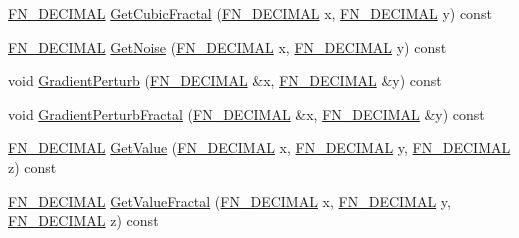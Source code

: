 \begin{DoxyCompactItemize}
\item 
\mbox{\hyperlink{_fast_noise_8h_a75a9ef6d2541c4921815b885bfd449c3}{F\+N\+\_\+\+D\+E\+C\+I\+M\+AL}} \mbox{\hyperlink{class_fast_noise_ae0ecd8c5e0bce59f68e11ad885f4284a}{Get\+Cubic\+Fractal}} (\mbox{\hyperlink{_fast_noise_8h_a75a9ef6d2541c4921815b885bfd449c3}{F\+N\+\_\+\+D\+E\+C\+I\+M\+AL}} x, \mbox{\hyperlink{_fast_noise_8h_a75a9ef6d2541c4921815b885bfd449c3}{F\+N\+\_\+\+D\+E\+C\+I\+M\+AL}} y) const
\item 
\mbox{\hyperlink{_fast_noise_8h_a75a9ef6d2541c4921815b885bfd449c3}{F\+N\+\_\+\+D\+E\+C\+I\+M\+AL}} \mbox{\hyperlink{class_fast_noise_a61722acaa5692a40ee939d578b6a40d1}{Get\+Noise}} (\mbox{\hyperlink{_fast_noise_8h_a75a9ef6d2541c4921815b885bfd449c3}{F\+N\+\_\+\+D\+E\+C\+I\+M\+AL}} x, \mbox{\hyperlink{_fast_noise_8h_a75a9ef6d2541c4921815b885bfd449c3}{F\+N\+\_\+\+D\+E\+C\+I\+M\+AL}} y) const
\item 
void \mbox{\hyperlink{class_fast_noise_a84d51e4e3c6abb7897954a4e77194e03}{Gradient\+Perturb}} (\mbox{\hyperlink{_fast_noise_8h_a75a9ef6d2541c4921815b885bfd449c3}{F\+N\+\_\+\+D\+E\+C\+I\+M\+AL}} \&x, \mbox{\hyperlink{_fast_noise_8h_a75a9ef6d2541c4921815b885bfd449c3}{F\+N\+\_\+\+D\+E\+C\+I\+M\+AL}} \&y) const
\item 
void \mbox{\hyperlink{class_fast_noise_ab3d6570d2a46f693ef4c63f10ea872ca}{Gradient\+Perturb\+Fractal}} (\mbox{\hyperlink{_fast_noise_8h_a75a9ef6d2541c4921815b885bfd449c3}{F\+N\+\_\+\+D\+E\+C\+I\+M\+AL}} \&x, \mbox{\hyperlink{_fast_noise_8h_a75a9ef6d2541c4921815b885bfd449c3}{F\+N\+\_\+\+D\+E\+C\+I\+M\+AL}} \&y) const
\item 
\mbox{\hyperlink{_fast_noise_8h_a75a9ef6d2541c4921815b885bfd449c3}{F\+N\+\_\+\+D\+E\+C\+I\+M\+AL}} \mbox{\hyperlink{class_fast_noise_ab2424cc7921a15da6eb683ab3bbfcbac}{Get\+Value}} (\mbox{\hyperlink{_fast_noise_8h_a75a9ef6d2541c4921815b885bfd449c3}{F\+N\+\_\+\+D\+E\+C\+I\+M\+AL}} x, \mbox{\hyperlink{_fast_noise_8h_a75a9ef6d2541c4921815b885bfd449c3}{F\+N\+\_\+\+D\+E\+C\+I\+M\+AL}} y, \mbox{\hyperlink{_fast_noise_8h_a75a9ef6d2541c4921815b885bfd449c3}{F\+N\+\_\+\+D\+E\+C\+I\+M\+AL}} z) const
\item 
\mbox{\hyperlink{_fast_noise_8h_a75a9ef6d2541c4921815b885bfd449c3}{F\+N\+\_\+\+D\+E\+C\+I\+M\+AL}} \mbox{\hyperlink{class_fast_noise_a972ef8f462048015489604783155fd17}{Get\+Value\+Fractal}} (\mbox{\hyperlink{_fast_noise_8h_a75a9ef6d2541c4921815b885bfd449c3}{F\+N\+\_\+\+D\+E\+C\+I\+M\+AL}} x, \mbox{\hyperlink{_fast_noise_8h_a75a9ef6d2541c4921815b885bfd449c3}{F\+N\+\_\+\+D\+E\+C\+I\+M\+AL}} y, \mbox{\hyperlink{_fast_noise_8h_a75a9ef6d2541c4921815b885bfd449c3}{F\+N\+\_\+\+D\+E\+C\+I\+M\+AL}} z) const

\end{DoxyCompactItemize}
